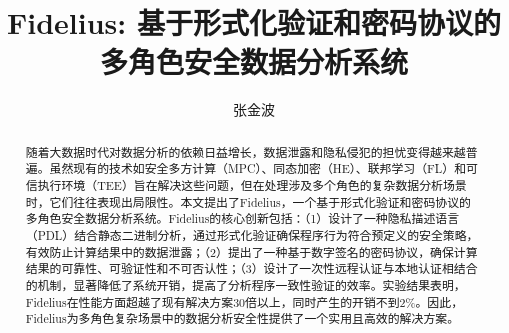 \documentclass[sigconf]{acmart}
\begin{document}
\title{Fidelius: 基于形式化验证和密码协议的多角色安全数据分析系统}




\author{张金波}


\renewcommand{\abstractname}{摘要}
\renewcommand{\keywordsname}{关键词}
\renewcommand{\figurename}{图}
\renewcommand{\tablename}{表}
\begin{abstract}
随着大数据时代对数据分析的依赖日益增长，数据泄露和隐私侵犯的担忧变得越来越普遍。虽然现有的技术如安全多方计算（MPC）、同态加密（HE）、联邦学习（FL）和可信执行环境（TEE）旨在解决这些问题，但在处理涉及多个角色的复杂数据分析场景时，它们往往表现出局限性。本文提出了Fidelius，一个基于形式化验证和密码协议的多角色安全数据分析系统。Fidelius的核心创新包括：（1）设计了一种隐私描述语言（PDL）结合静态二进制分析，通过形式化验证确保程序行为符合预定义的安全策略，有效防止计算结果中的数据泄露；（2）提出了一种基于数字签名的密码协议，确保计算结果的可靠性、可验证性和不可否认性；（3）设计了一次性远程认证与本地认证相结合的机制，显著降低了系统开销，提高了分析程序一致性验证的效率。实验结果表明，Fidelius在性能方面超越了现有解决方案30倍以上，同时产生的开销不到2\%。因此，Fidelius为多角色复杂场景中的数据分析安全性提供了一个实用且高效的解决方案。
\end{abstract}



\end{document}

